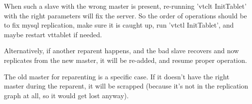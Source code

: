 When such a slave with the wrong master is present, re-running 'vtclt InitTablet' with the right parameters will fix the server. So the order of operations should be to fix mysql replication, make sure it is caught up, run 'vtctl InitTablet', and maybe restart vttablet if needed.

Alternatively, if another reparent happens, and the bad slave recovers and now replicates from the new master, it will be re-added, and resume proper operation.

The old master for reparenting is a specific case. If it doesn't have the right master during the reparent, it will be scrapped (because it's not in the replication graph at all, so it would get lost anyway).

